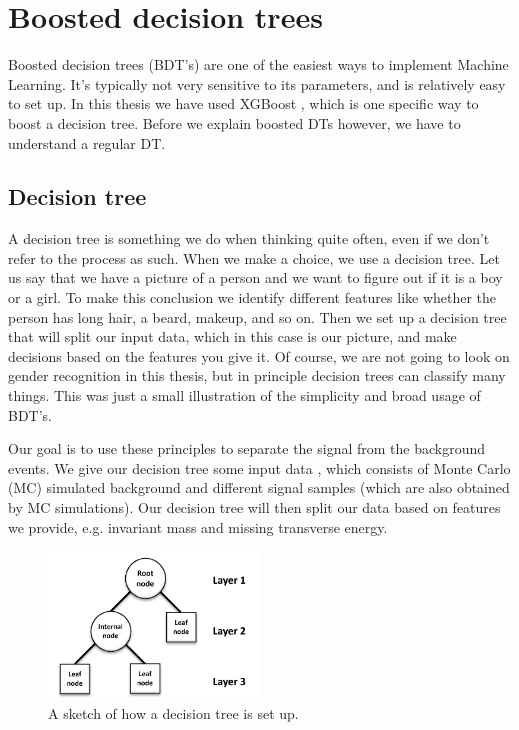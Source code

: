\section{Boosted decision trees}
\label{sec:BDT}

Boosted decision trees (BDT's) are one of the easiest ways to implement Machine Learning. It's typically not very sensitive to its parameters, and is relatively easy to set up. In this thesis we have used XGBoost \cite{xgboostAbout}, which is one specific way to boost a decision tree. Before we explain boosted DTs however, we have to understand a regular DT.


\subsection{Decision tree}

A decision tree is something we do when thinking quite often, even if we don't refer to the process as such. When we make a choice, we use a decision tree. Let us say that we have a picture of a person and we want to figure out if it is a boy or a girl. To make this conclusion we identify different features like whether the person has long hair, a beard, makeup, and so on. Then we set up a decision tree that will split our input data, which in this case is our picture, and make decisions based on the features you give it. Of course, we are not going to look on gender recognition in this thesis, but in principle decision trees can classify many things. This was just a small illustration of the simplicity and broad usage of BDT's.

Our goal is to use these principles to separate the signal from the background events. We give our decision tree some input data \cite{DTppt}, which consists of Monte Carlo (MC) simulated background and different signal samples (which are also obtained by MC simulations). Our decision tree will then split our data based on features we provide, e.g. invariant mass and missing transverse energy. 

\begin{figure}[H]
    \centering
    \includegraphics[width=0.5\textwidth]{Figures/FromOnline/Basic-structure-of-a-decision-tree-All-decision-trees-are-built-through-recursion.png}
    \caption{A sketch of how a decision tree is set up. \cite{DTpic}}
    \label{fig:DTpic}
\end{figure}

